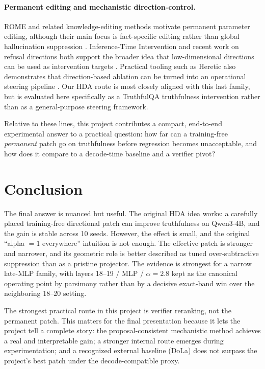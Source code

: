 \documentclass{article}
\begin{document}
\paragraph{Permanent editing and mechanistic direction-control.}
ROME and related knowledge-editing methods motivate permanent parameter editing, although their main focus is fact-specific editing rather than global hallucination suppression \citep{meng2022rome}. Inference-Time Intervention and recent work on refusal directions both support the broader idea that low-dimensional directions can be used as intervention targets \citep{li2024iti,arditi2024refusal}. Practical tooling such as Heretic also demonstrates that direction-based ablation can be turned into an operational steering pipeline \citep{weidmann2025heretic}. Our HDA route is most closely aligned with this last family, but is evaluated here specifically as a TruthfulQA truthfulness intervention rather than as a general-purpose steering framework.

Relative to these lines, this project contributes a compact, end-to-end experimental answer to a practical question: how far can a training-free \emph{permanent} patch go on truthfulness before regression becomes unacceptable, and how does it compare to a decode-time baseline and a verifier pivot?

\section{Conclusion}
The final answer is nuanced but useful. The original HDA idea works: a carefully placed training-free directional patch can improve truthfulness on Qwen3-4B, and the gain is stable across 10 seeds. However, the effect is small, and the original ``alpha $=1$ everywhere'' intuition is not enough. The effective patch is stronger and narrower, and its geometric role is better described as tuned over-subtractive suppression than as a pristine projector. The evidence is strongest for a narrow late-MLP family, with layers 18--19 / MLP / $\alpha=2.8$ kept as the canonical operating point by parsimony rather than by a decisive exact-band win over the neighboring 18--20 setting.

The strongest practical route in this project is verifier reranking, not the permanent patch. This matters for the final presentation because it lets the project tell a complete story: the proposal-consistent mechanistic method achieves a real and interpretable gain; a stronger internal route emerges during experimentation; and a recognized external baseline (DoLa) does not surpass the project's best patch under the decode-compatible proxy.
\end{document}
